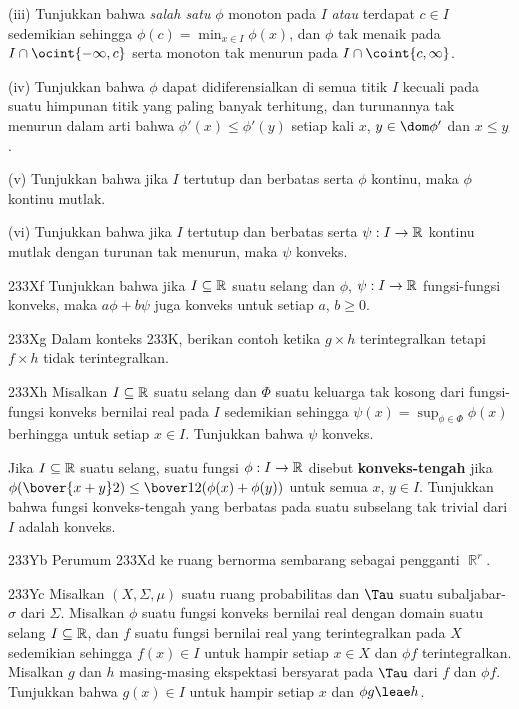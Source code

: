 {\quad (iii) Tunjukkan bahwa {\it salah satu} $\phi$ monoton pada $I$
{\it atau} terdapat $c\in I$ sedemikian sehingga
$\phi(c)=\min_{x\in I}\phi(x)$, dan $\phi$ tak menaik pada
$I\cap\ocint{-\infty,c}$ serta monoton tak menurun pada
$I\cap\coint{c,\infty}$.

\quad (iv) Tunjukkan bahwa $\phi$ dapat didiferensialkan di semua titik
$I$ kecuali pada suatu himpunan titik yang paling banyak terhitung, dan turunannya tak
menurun dalam arti bahwa $\phi'(x)\le\phi'(y)$ setiap kali
$x$, $y\in\dom\phi'$ dan $x\le y$.

\quad (v) Tunjukkan bahwa jika $I$ tertutup dan berbatas serta $\phi$
kontinu, maka $\phi$ kontinu mutlak.

\quad (vi) Tunjukkan bahwa jika $I$ tertutup dan berbatas serta
$\psi:I\to\Bbb R$ kontinu mutlak dengan turunan tak menurun, maka $\psi$
konveks.

\spheader 233Xf Tunjukkan bahwa jika $I\subseteq\Bbb R$ suatu selang dan
$\phi$, $\psi:I\to\Bbb R$ fungsi-fungsi konveks, maka
$a\phi+b\psi$ juga konveks untuk setiap $a$, $b\ge 0$.

\spheader 233Xg Dalam konteks 233K, berikan contoh ketika $g\times h$
terintegralkan tetapi $f\times h$ tidak terintegralkan.

\spheader 233Xh Misalkan $I\subseteq\Bbb R$ suatu selang dan $\Phi$
suatu keluarga tak kosong dari fungsi-fungsi konveks bernilai real pada
$I$ sedemikian sehingga $\psi(x)=\sup_{\phi\in\Phi}\phi(x)$ berhingga
untuk setiap $x\in I$. Tunjukkan bahwa $\psi$ konveks.

 Jika $I\subseteq\Bbb R$ suatu
selang, suatu fungsi $\phi:I\to\Bbb R$ disebut {\bf konveks-tengah} jika
$\phi(\bover{x+y}2)\le\bover12(\phi(x)+\phi(y))$ untuk semua
$x$, $y\in I$. Tunjukkan bahwa fungsi konveks-tengah yang berbatas pada
suatu subselang tak trivial dari $I$ adalah konveks.

\spheader 233Yb Perumum 233Xd ke ruang bernorma sembarang sebagai
pengganti $\BbbR^r$.

\spheader 233Yc Misalkan $(X,\Sigma,\mu)$ suatu ruang probabilitas dan
$\Tau$ suatu subaljabar-$\sigma$ dari $\Sigma$. Misalkan $\phi$ suatu
fungsi konveks bernilai real dengan domain suatu selang
$I\subseteq\Bbb R$, dan $f$ suatu fungsi bernilai real yang terintegralkan
pada $X$ sedemikian sehingga $f(x)\in I$ untuk hampir setiap $x\in X$
dan $\phi f$ terintegralkan. Misalkan $g$ dan $h$ masing-masing
ekspektasi bersyarat pada $\Tau$ dari $f$ dan $\phi f$. Tunjukkan bahwa
$g(x)\in I$ untuk hampir setiap $x$ dan $\phi g\leae h$.

}

